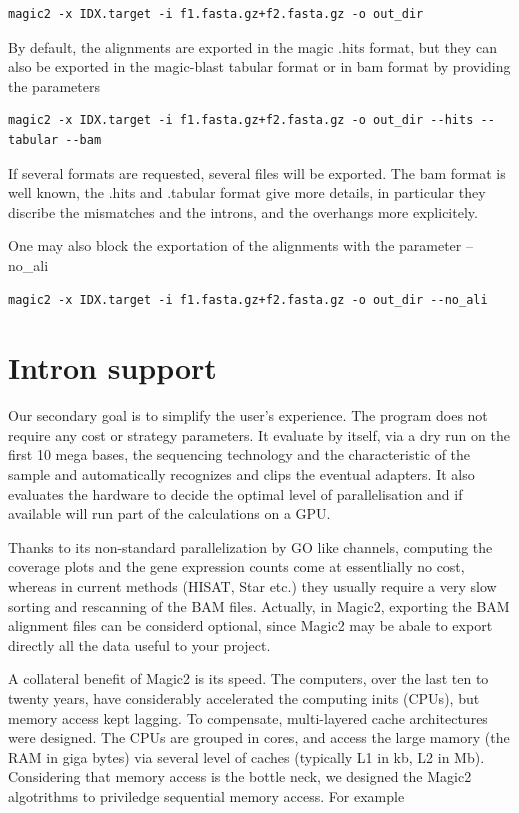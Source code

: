 \documentclass[11pt]{article}
\newcommand{\BL}{\begin{lstlisting}}
\begin{document}
\BL
magic2 -x IDX.target -i f1.fasta.gz+f2.fasta.gz -o out_dir
\end{lstlisting}

By default, the alignments are exported in the magic .hits format, but they can also be 
exported in the magic-blast tabular format or in bam format by providing the parameters

\BL
magic2 -x IDX.target -i f1.fasta.gz+f2.fasta.gz -o out_dir --hits --tabular --bam
\end{lstlisting}
If several formats are requested, several files will be exported. The bam format is well known,
the .hits and .tabular format give more details, in particular they discribe the
mismatches and the introns, and the overhangs more explicitely.

One may also block the exportation of the alignments with the parameter --no\_ali
\BL
magic2 -x IDX.target -i f1.fasta.gz+f2.fasta.gz -o out_dir --no_ali
\end{lstlisting}

\section {Intron support}

Our secondary goal is to simplify the user's experience. The program
does not require any cost or strategy parameters. It evaluate by itself, via
a dry run on the first 10 mega bases, the sequencing technology and the
characteristic of the sample and automatically recognizes and clips
the eventual adapters. It also evaluates the hardware to decide the optimal level
of parallelisation and if available will run part of the calculations on a GPU.

Thanks to its non-standard parallelization by GO like channels,
computing the coverage plots and the gene expression counts come at essentlially no
cost, whereas in current  methods (HISAT, Star etc.)  they usually require a very slow sorting and rescanning
of the BAM files. Actually, in Magic2, exporting the BAM alignment files can be considerd
optional, since Magic2 may be abale to export directly all the data useful to your project.

A collateral benefit of Magic2 is its speed. The computers, over the last ten to twenty years,
have considerably accelerated the computing inits (CPUs), but memory access kept lagging.
To compensate, multi-layered cache architectures were designed. The CPUs are grouped in cores,
and access the large mamory (the RAM in giga bytes) via several level of caches (typically L1 in kb, L2 in Mb).
Considering that memory access is the bottle neck, we designed the Magic2 algotrithms to priviledge
sequential memory access. For example
\end{document}
